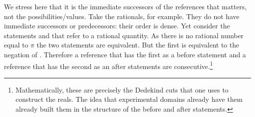 \documentclass[11pt,letterpaper,fleqn]{memoir} %
\begin{document}
We stress here that it is the immediate successors of the references that matters, not the possibilities/values. Take the rationals, for example. They do not have immediate successors or predecessors: their order is dense. Yet consider the statements  and  that refer to a rational quantity. As there is no rational number equal to $\pi$ the two statements are equivalent. But the first is equivalent to the negation of . Therefore a reference that has the first as a before statement and a reference that has the second as an after statements are consecutive.\footnote{Mathematically, these are precisely the Dedekind cuts that one uses to construct the reals. The idea that experimental domains already have them already built them in the structure of the before and after statements.}
\end{document}
